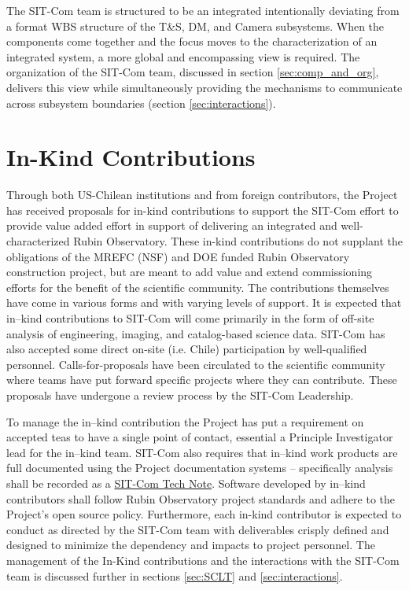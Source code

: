 \documentclass[SE,lsstdraft,authoryear,toc]{lsstdoc, lsstdraft}
\begin{document}
The SIT-Com team is structured to be an integrated intentionally deviating from a format WBS structure of the T\&S, DM, and Camera subsystems.
When the components come together and the focus moves to the characterization of an integrated system, a more global and encompassing view is required.
The organization of the SIT-Com team, discussed in section \ref{sec:comp_and_org}, delivers this view while simultaneously providing the mechanisms to communicate across subsystem boundaries (section \ref{sec:interactions}).

\section{In-Kind Contributions}
\label{sec:in_kind}

Through both US-Chilean institutions and from foreign contributors, the Project has received proposals for in-kind contributions to support the SIT-Com effort to provide value added effort in support of delivering an integrated and well-characterized Rubin Observatory.
These in-kind contributions do not supplant the obligations of the MREFC (NSF) and DOE funded Rubin Observatory construction project, but are meant to add value and extend commissioning efforts for the benefit of the scientific community.
The contributions themselves have come in various forms and with varying levels of support.
It is expected that in--kind contributions to SIT-Com will come primarily in the form of off-site analysis of engineering, imaging, and catalog-based science data.
SIT-Com has also accepted some direct on-site (i.e. Chile) participation by well-qualified personnel.
Calls-for-proposals have been circulated to the scientific community where teams have put forward specific projects where they can contribute.
These proposals have undergone a review process by the SIT-Com Leadership.

To manage the in--kind contribution the Project has put a requirement on accepted teas to have a single point of contact, essential a Principle Investigator lead for the in--kind team.
SIT-Com also requires that in--kind work products are full documented using the Project documentation systems -- specifically analysis shall be recorded as a \href{https://www.lsst.io/sitcomtn/?}{SIT-Com Tech Note}.
Software developed by in--kind contributors shall follow Rubin Observatory project standards and adhere to the Project's open source policy.
Furthermore, each in-kind contributor is expected to conduct as directed by the SIT-Com team with deliverables crisply defined and designed to minimize the dependency and impacts to project personnel.
The management of the In-Kind contributions and the interactions with the SIT-Com team is discussed further in sections \ref{sec:SCLT} and \ref{sec:interactions}.
\end{document}

